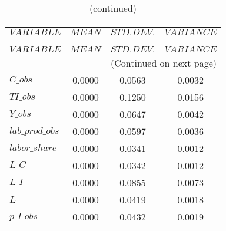  
\begin{center}
\begin{longtable}{lccc} 
\caption{THEORETICAL MOMENTS}\\
 \label{Table:th_moments}\\
\toprule 
$VARIABLE        $	 & 	 $         MEAN$	 & 	 $    STD. DEV.$	 & 	 $     VARIANCE$\\
\midrule \endfirsthead 
\caption{(continued)}\\
 \toprule \\ 
$VARIABLE        $	 & 	 $         MEAN$	 & 	 $    STD. DEV.$	 & 	 $     VARIANCE$\\
\midrule \endhead 
\midrule \multicolumn{4}{r}{(Continued on next page)} \\ \bottomrule \endfoot 
\bottomrule \endlastfoot 
$C\_obs          $	 & 	       0.0000	 & 	       0.0563	 & 	       0.0032 \\ 
$TI\_obs         $	 & 	       0.0000	 & 	       0.1250	 & 	       0.0156 \\ 
$Y\_obs          $	 & 	       0.0000	 & 	       0.0647	 & 	       0.0042 \\ 
$lab\_prod\_obs  $	 & 	       0.0000	 & 	       0.0597	 & 	       0.0036 \\ 
$labor\_share    $	 & 	       0.0000	 & 	       0.0341	 & 	       0.0012 \\ 
$L\_C            $	 & 	       0.0000	 & 	       0.0342	 & 	       0.0012 \\ 
$L\_I            $	 & 	       0.0000	 & 	       0.0855	 & 	       0.0073 \\ 
$L               $	 & 	       0.0000	 & 	       0.0419	 & 	       0.0018 \\ 
$p\_I\_obs       $	 & 	       0.0000	 & 	       0.0432	 & 	       0.0019 \\ 
\end{longtable}
 \end{center}
